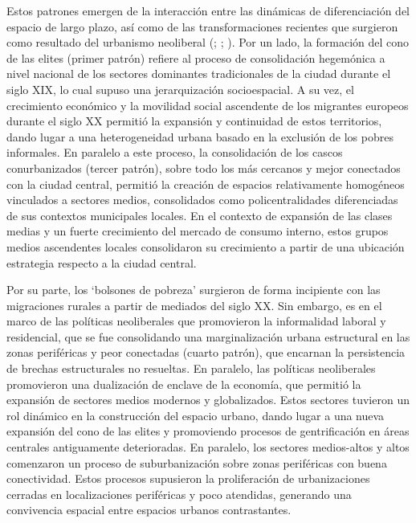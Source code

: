 \documentclass[
  spanish,
  a4paper,%
  chapterprefix=true,%
  DIV=calc,%
  twoside]{scrbook}%
\begin{document}
Estos patrones emergen de la interacción entre las dinámicas de
diferenciación del espacio de largo plazo, así como de las
transformaciones recientes que surgieron como resultado del urbanismo
neoliberal (; ; ). Por un lado, la
formación del cono de las elites (primer patrón) refiere al proceso de
consolidación hegemónica a nivel nacional de los sectores dominantes
tradicionales de la ciudad durante el siglo XIX, lo cual supuso una
jerarquización socioespacial. A su vez, el crecimiento económico y la
movilidad social ascendente de los migrantes europeos durante el siglo
XX permitió la expansión y continuidad de estos territorios, dando lugar
a una heterogeneidad urbana basado en la exclusión de los pobres
informales. En paralelo a este proceso, la consolidación de los cascos
conurbanizados (tercer patrón), sobre todo los más cercanos y mejor
conectados con la ciudad central, permitió la creación de espacios
relativamente homogéneos vinculados a sectores medios, consolidados como
policentralidades diferenciadas de sus contextos municipales locales. En
el contexto de expansión de las clases medias y un fuerte crecimiento
del mercado de consumo interno, estos grupos medios ascendentes locales
consolidaron su crecimiento a partir de una ubicación estrategia
respecto a la ciudad central.

Por su parte, los `bolsones de pobreza' surgieron de forma incipiente
con las migraciones rurales a partir de mediados del siglo XX. Sin
embargo, es en el marco de las políticas neoliberales que promovieron la
informalidad laboral y residencial, que se fue consolidando una
marginalización urbana estructural en las zonas periféricas y peor
conectadas (cuarto patrón), que encarnan la persistencia de brechas
estructurales no resueltas. En paralelo, las políticas neoliberales
promovieron una dualización de enclave de la economía, que permitió la
expansión de sectores medios modernos y globalizados. Estos sectores
tuvieron un rol dinámico en la construcción del espacio urbano, dando
lugar a una nueva expansión del cono de las elites y promoviendo
procesos de gentrificación en áreas centrales antiguamente deterioradas.
En paralelo, los sectores medios-altos y altos comenzaron un proceso de
suburbanización sobre zonas periféricas con buena conectividad. Estos
procesos supusieron la proliferación de urbanizaciones cerradas en
localizaciones periféricas y poco atendidas, generando una convivencia
espacial entre espacios urbanos contrastantes.
\end{document}
